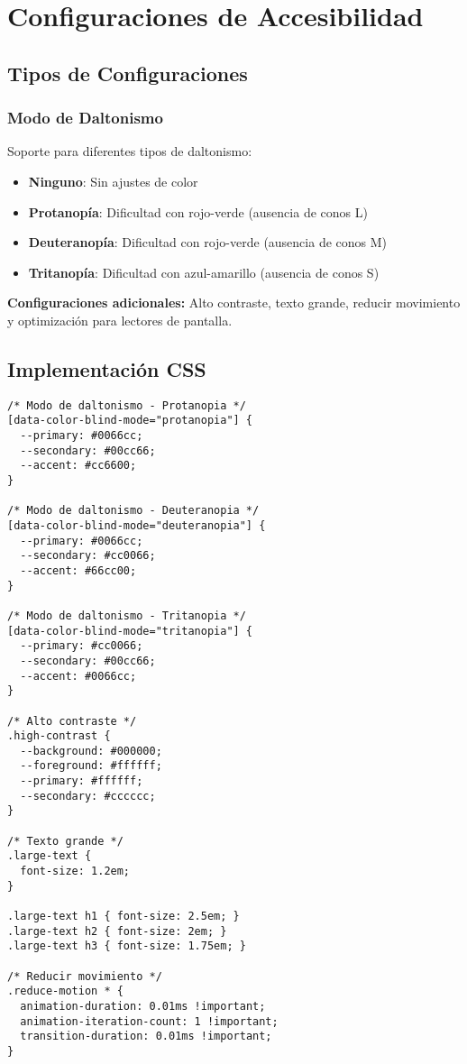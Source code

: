 \documentclass[12pt,a4paper]{article}
\begin{document}
\section{Configuraciones de Accesibilidad}

\subsection{Tipos de Configuraciones}

\subsubsection{Modo de Daltonismo}

Soporte para diferentes tipos de daltonismo:

\begin{itemize}
    \item \textbf{Ninguno}: Sin ajustes de color
    \item \textbf{Protanopía}: Dificultad con rojo-verde (ausencia de conos L)
    \item \textbf{Deuteranopía}: Dificultad con rojo-verde (ausencia de conos M)
    \item \textbf{Tritanopía}: Dificultad con azul-amarillo (ausencia de conos S)
\end{itemize}

\textbf{Configuraciones adicionales:} Alto contraste, texto grande, reducir movimiento y optimización para lectores de pantalla.

\subsection{Implementación CSS}

\begin{lstlisting}[caption=Implementación de estilos de accesibilidad]
/* Modo de daltonismo - Protanopia */
[data-color-blind-mode="protanopia"] {
  --primary: #0066cc;
  --secondary: #00cc66;
  --accent: #cc6600;
}

/* Modo de daltonismo - Deuteranopia */
[data-color-blind-mode="deuteranopia"] {
  --primary: #0066cc;
  --secondary: #cc0066;
  --accent: #66cc00;
}

/* Modo de daltonismo - Tritanopia */
[data-color-blind-mode="tritanopia"] {
  --primary: #cc0066;
  --secondary: #00cc66;
  --accent: #0066cc;
}

/* Alto contraste */
.high-contrast {
  --background: #000000;
  --foreground: #ffffff;
  --primary: #ffffff;
  --secondary: #cccccc;
}

/* Texto grande */
.large-text {
  font-size: 1.2em;
}

.large-text h1 { font-size: 2.5em; }
.large-text h2 { font-size: 2em; }
.large-text h3 { font-size: 1.75em; }

/* Reducir movimiento */
.reduce-motion * {
  animation-duration: 0.01ms !important;
  animation-iteration-count: 1 !important;
  transition-duration: 0.01ms !important;
}
\end{lstlisting}
\end{document}
